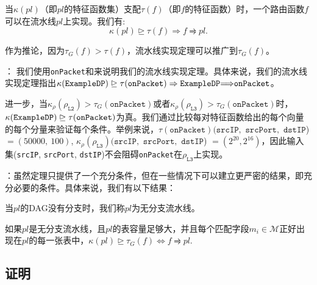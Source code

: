 \begin{theorem}[流水线实现定理] 当$\kappa(pl)$（即$pl$的特征函数集）支配$\tau(f)$（即$f$的特征函数）时，一个路由函数$f$可以在流水线$pl$上实现。我们有:
\begin{equation*}
\kappa(pl) \trianglerighteq \tau(f) \Rightarrow f \rightrightharpoons pl.
\end{equation*}
\end{theorem}

作为推论，因为$\tau_G(f) > \tau(f)$，流水线实现定理可以推广到$\tau_G(f)$。

： 我们使用\texttt{onPacket}和\exampledp 来说明我们的流水线实现定理。具体来说，我们的流水线实现定理指出$\kappa(\texttt{ExampleDP}) \trianglerighteq \tau(\texttt{onPacket}) \Rightarrow \texttt{ExampleDP} {\Longrightarrow} \texttt{onPacket}$。

进一步，当$\kappa_\rho(\rho_{\texttt{L2}}) > \tau_G(\texttt{onPacket})$或者$\kappa_\rho(\rho_{\texttt{L3}}) > \tau_G(\texttt{onPacket})$时，$\kappa(\texttt{ExampleDP}) \trianglerighteq \tau(\texttt{onPacket})$为真。我们通过比较每对特征函数给出的每个向量的每个分量来验证每个条件。举例来说，$\tau(\texttt{onPacket})(\texttt{srcIP},$ $\texttt{srcPort},$ $\texttt{dstIP}$) $ = (50000,\ 100)$,  $\kappa_\rho(\rho_{\texttt{L3}})(\texttt{srcIP},$ $\texttt{srcPort},$ $\texttt{dstIP}$) $ = (2^{20}, 2^{16})$，因此输入集(\texttt{srcIP}, \texttt{srcPort}, \texttt{dstIP})不会阻碍\texttt{onPacket}在$\rho_{\texttt{L3}}$上实现。




：虽然定理只提供了一个充分条件，但在一些情况下可以建立更严密的结果，即充分必要的条件。具体来说，我们有以下结果：

\begin{definition} 当$pl$的DAG没有分支时，我们称$pl$为无分支流水线。
\end{definition}

\begin{theorem}[无分支流水线实现定理] 如果$pl$是无分支流水线，且$pl$的表容量足够大，并且每个匹配字段$m_i \in \mathcal{M}$正好出现在$pl$的每一张表中，$\kappa(pl) \trianglerighteq \tau_G(f) \Leftrightarrow f \rightrightharpoons pl$.
\end{theorem}





\subsection{证明}

